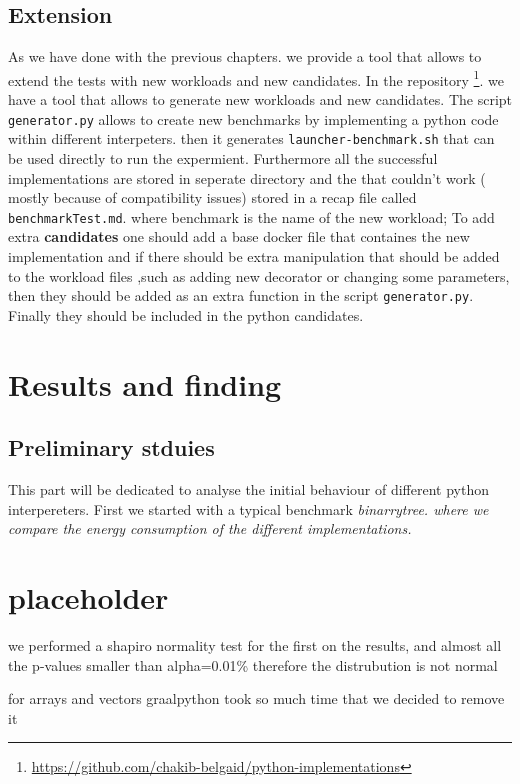 \subsection{Extension}
As we have done with the previous chapters. we provide a tool that allows to extend the tests with new workloads and new candidates.
In the repository \footnote{\url{https://github.com/chakib-belgaid/python-implementations}}.
we have a tool that allows to generate new workloads and new candidates.
The script \texttt{generator.py} allows to create new benchmarks by implementing a python code within different interpeters. then it generates \texttt{launcher-benchmark.sh} that can be used directly to run the expermient. Furthermore all the successful implementations are stored in seperate directory and the that couldn't work ( mostly because of compatibility issues) stored in a recap file called \texttt{benchmarkTest.md}. where benchmark is the name of the new workload;
To add extra \textbf{candidates} one should add a base docker file
that containes the new implementation and if there should be extra manipulation that should be added to the workload files ,such as adding new decorator or changing some parameters, then they should be added as an extra function in the script \texttt{generator.py}. Finally they should be included in the python candidates.

\section{Results and finding}

\subsection{Preliminary stduies}
This part will be dedicated to analyse the initial behaviour of different python interpereters.
First we started with a typical benchmark \em binarrytree. where we compare the energy consumption of the different implementations.


\section{placeholder}

we performed a shapiro normality test for the first on the results, and almost all the p-values smaller than alpha=0.01\% therefore the distrubution is not normal

for arrays and vectors  graalpython took so much time that we decided to remove it

